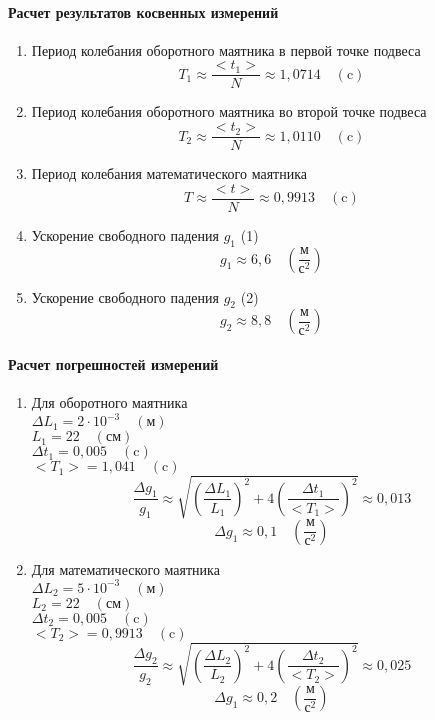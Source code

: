 \documentclass{article}
\begin{document}
\paragraph{Расчет результатов косвенных измерений }
\begin{enumerate}
\item Период колебания оборотного маятника в первой точке подвеса
$$T_1\approx\frac{<t_1>}{N}\approx 1{,}0714\quad(\mbox{c}) $$
\item Период колебания оборотного маятника во второй точке подвеса
$$T_2\approx\frac{<t_2>}{N}\approx 1{,}0110\quad(\mbox{c})  $$
\item Период колебания математического маятника
$$T\approx\frac{<t>}{N}\approx 0{,}9913\quad(\mbox{c})  $$
\item Ускорение свободного падения $g_1$ (1)
$$ g_1\approx 6,6\quad\left(\frac{\mbox{м}}{\mbox{с}^2}\right) $$
\item Ускорение свободного падения $g_2$ (2)
$$ g_2\approx 8,8\quad\left(\frac{\mbox{м}}{\mbox{с}^2}\right) $$
\end{enumerate}

\paragraph{Расчет погрешностей измерений }
\begin{enumerate}
	\item Для оборотного маятника\\
	$\Delta L_1 =2\cdot10^{-3} \quad(\mbox{м})$\\
	$L_1 = 22 \quad(\mbox{см})$\\
	$\Delta t_1 = 0,005 \quad(\mbox{c})$\\
	$ <T_1>= 1,041 \quad(\mbox{c})$
	$$\frac{\Delta g_1}{g_1}\approx\sqrt{\left(\frac{\Delta L_1}{L_1}\right)^2+4\left(\frac{\Delta t_1}{<T_1>}\right)^2}\approx0,013$$
	$$ \Delta g_1\approx0,1\quad\left(\frac{\mbox{м}}{\mbox{с}^2}\right)$$
		\item Для математического маятника\\
	$\Delta L_2 =5\cdot10^{-3} \quad(\mbox{м})$\\
	$L_2 = 22 \quad(\mbox{см})$\\
	$\Delta t_2 = 0,005 \quad(\mbox{c})$\\
	$ <T_2>= 0,9913 \quad(\mbox{c})$
	$$\frac{\Delta g_2}{g_2}\approx\sqrt{\left(\frac{\Delta L_2}{L_2}\right)^2+4\left(\frac{\Delta t_2}{<T_2>}\right)^2}\approx0,025$$
	$$ \Delta g_1\approx0,2 \quad\left(\frac{\mbox{м}}{\mbox{с}^2}\right)$$
\end{enumerate}
\end{document}
